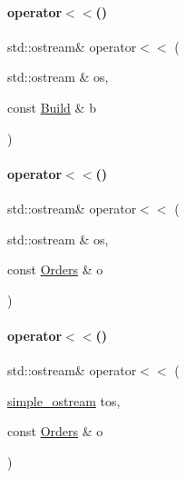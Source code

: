 \paragraph{\texorpdfstring{operator$<$$<$()}{operator<<()}\hspace{0.1cm}{\footnotesize\ttfamily [1/3]}}
{\footnotesize\ttfamily std\+::ostream\& operator$<$$<$ (\begin{DoxyParamCaption}\item[{std\+::ostream \&}]{os,  }\item[{const \mbox{\hyperlink{class_build}{Build}} \&}]{b }\end{DoxyParamCaption})}

\mbox{\label{_builds_8h_a5fb6be27fb40218ba8338cb8727178cd}} 
\paragraph{\texorpdfstring{operator$<$$<$()}{operator<<()}\hspace{0.1cm}{\footnotesize\ttfamily [2/3]}}
{\footnotesize\ttfamily std\+::ostream\& operator$<$$<$ (\begin{DoxyParamCaption}\item[{std\+::ostream \&}]{os,  }\item[{const \mbox{\hyperlink{class_orders}{Orders}} \&}]{o }\end{DoxyParamCaption})}

\mbox{\label{_builds_8h_a6125e4e6c603847e74d5f5ccb05da74e}} 
\paragraph{\texorpdfstring{operator$<$$<$()}{operator<<()}\hspace{0.1cm}{\footnotesize\ttfamily [3/3]}}
{\footnotesize\ttfamily std\+::ostream\& operator$<$$<$ (\begin{DoxyParamCaption}\item[{\mbox{\hyperlink{structsimple__ostream}{simple\+\_\+ostream}}}]{tos,  }\item[{const \mbox{\hyperlink{class_orders}{Orders}} \&}]{o }\end{DoxyParamCaption})}

